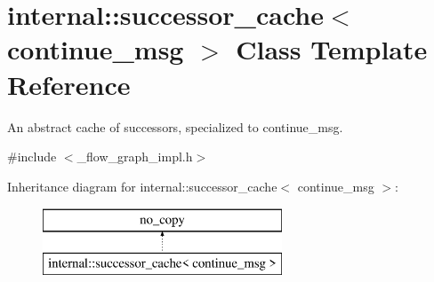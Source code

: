 \hypertarget{classinternal_1_1successor__cache_3_01continue__msg_01_4}{}\section{internal\+:\+:successor\+\_\+cache$<$ continue\+\_\+msg $>$ Class Template Reference}
\label{classinternal_1_1successor__cache_3_01continue__msg_01_4}


An abstract cache of successors, specialized to continue\+\_\+msg.  




{\ttfamily \#include $<$\+\_\+flow\+\_\+graph\+\_\+impl.\+h$>$}

Inheritance diagram for internal\+:\+:successor\+\_\+cache$<$ continue\+\_\+msg $>$\+:\begin{figure}[H]
\begin{center}
\leavevmode
\includegraphics[height=2.000000cm]{classinternal_1_1successor__cache_3_01continue__msg_01_4}
\end{center}
\end{figure}
